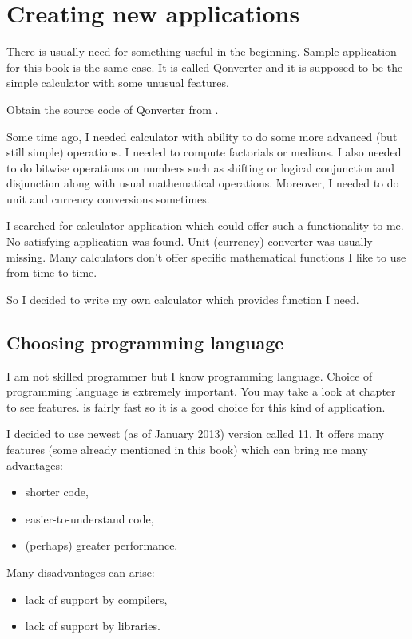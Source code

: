 \chapter{Creating new applications}\label{chap:new}
There is usually need for something useful in the beginning. Sample application for this book is the same case. It is called Qonverter and it is supposed to be the simple calculator with some unusual features.

\begin{fdocextra}
Obtain the source code of Qonverter from \citep{various:qonrepo}.
\end{fdocextra}

Some time ago, I needed calculator with ability to do some more advanced (but still simple) operations. I needed to compute factorials or medians. I also needed to do bitwise operations on numbers such as shifting or logical conjunction and disjunction along with usual mathematical operations. Moreover, I needed to do unit and currency conversions sometimes.

I searched for calculator application which could offer such a functionality to me. No satisfying application was found. Unit (currency) converter was usually missing. Many calculators don't offer specific mathematical functions I like to use from time to time.

So I decided to write my own calculator which provides function I need.

\section{Choosing programming language}
I am not skilled programmer but I know \cpp{} programming language. Choice of programming language is extremely important. You may take a look at chapter  to see \cpp{} features. \cpp{} is fairly fast so it is a good choice for this kind of application.

I decided to use newest (as of January 2013) \cpp{} version called \cpp{} 11. It offers many features (some already mentioned in this book) which can bring me many advantages:
\begin{itemize}
\item shorter code,
\item easier-to-understand code,
\item (perhaps) greater performance.
\end{itemize}

Many disadvantages can arise:
\begin{itemize}
\item lack of support by \cpp{} compilers,
\item lack of support by libraries.
\end{itemize}

